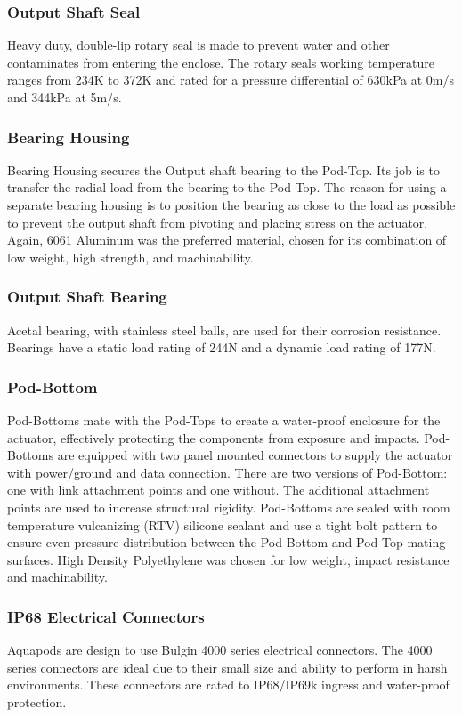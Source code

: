 \subsubsection{Output Shaft Seal}
Heavy duty, double-lip rotary seal is made to prevent water and other contaminates from entering the enclose. The rotary seals working temperature ranges from 234K to 372K and rated for a pressure differential of 630kPa at 0m/s and 344kPa at 5m/s. 


\subsubsection{Bearing Housing}
Bearing Housing secures the Output shaft bearing to the Pod-Top. Its job is to transfer the radial load from the bearing to the Pod-Top. The reason for using a separate bearing housing is to position the bearing as close to the load as possible to prevent the output shaft from pivoting and placing stress on the actuator.
Again, 6061 Aluminum was the preferred material, chosen for its combination of low weight, high strength, and machinability.

\subsubsection{Output Shaft Bearing}
Acetal bearing, with stainless steel balls, are used for their corrosion resistance. Bearings have a static load rating of 244N and a dynamic load rating of 177N. 

\subsubsection{Pod-Bottom}
Pod-Bottoms mate with the Pod-Tops to create a water-proof enclosure for the actuator, effectively protecting the components from exposure and impacts. Pod-Bottoms are equipped with two panel mounted connectors to supply the actuator with power/ground and data connection. There are two versions of Pod-Bottom: one with link attachment points and one without. The additional attachment points are used to increase structural rigidity. Pod-Bottoms are sealed with room temperature vulcanizing (RTV) silicone sealant and use a tight bolt pattern to ensure even pressure distribution between the Pod-Bottom and Pod-Top mating surfaces.
High Density Polyethylene was chosen for low weight, impact resistance and machinability. 

\subsubsection{IP68 Electrical Connectors}
Aquapods are design to use Bulgin 4000 series electrical connectors. The 4000 series connectors are ideal due to their small size and ability to perform in harsh environments. These connectors are rated to IP68/IP69k ingress and water-proof protection. 


